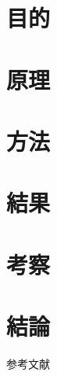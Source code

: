 \documentclass[a4paper,11pt]{jsarticle}
\title{}
\date{\today}
\author{\\
学籍番号:1111\\
氏名:桃太郎}
\begin{document}
\maketitle

\newpage

\section{目的}
\section{原理}
\section{方法}
\section{結果}
\section{考察}
\section{結論}

\begin{thebibliography}{99}
    参考文献
\end{thebibliography}
  
\end{document}
